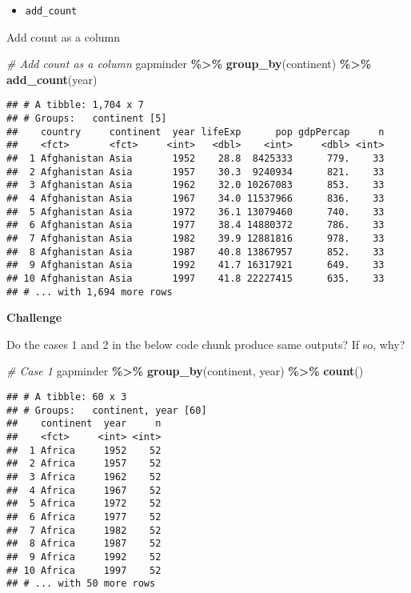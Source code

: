 \documentclass[
]{book}
\newenvironment{Shaded}{\begin{snugshade}}{\end{snugshade}}
\newcommand{\CommentTok}[1]{\textcolor[rgb]{0.56,0.35,0.01}{\textit{#1}}}
\newcommand{\KeywordTok}[1]{\textcolor[rgb]{0.13,0.29,0.53}{\textbf{#1}}}
\newcommand{\NormalTok}[1]{#1}
\newcommand{\OperatorTok}[1]{\textcolor[rgb]{0.81,0.36,0.00}{\textbf{#1}}}
\newcommand{\StringTok}[1]{\textcolor[rgb]{0.31,0.60,0.02}{#1}}
\providecommand{\tightlist}{%
  \setlength{\itemsep}{0pt}\setlength{\parskip}{0pt}}
\begin{document}
\begin{itemize}
\tightlist
\item
  \texttt{add\_count}
\end{itemize}

Add count as a column

\begin{Shaded}
\begin{Highlighting}[]
\CommentTok{\# Add count as a column}
\NormalTok{gapminder }\OperatorTok{\%\textgreater{}\%}
\StringTok{  }\KeywordTok{group\_by}\NormalTok{(continent) }\OperatorTok{\%\textgreater{}\%}
\StringTok{  }\KeywordTok{add\_count}\NormalTok{(year)}
\end{Highlighting}
\end{Shaded}

\begin{verbatim}
## # A tibble: 1,704 x 7
## # Groups:   continent [5]
##    country     continent  year lifeExp      pop gdpPercap     n
##    <fct>       <fct>     <int>   <dbl>    <int>     <dbl> <int>
##  1 Afghanistan Asia       1952    28.8  8425333      779.    33
##  2 Afghanistan Asia       1957    30.3  9240934      821.    33
##  3 Afghanistan Asia       1962    32.0 10267083      853.    33
##  4 Afghanistan Asia       1967    34.0 11537966      836.    33
##  5 Afghanistan Asia       1972    36.1 13079460      740.    33
##  6 Afghanistan Asia       1977    38.4 14880372      786.    33
##  7 Afghanistan Asia       1982    39.9 12881816      978.    33
##  8 Afghanistan Asia       1987    40.8 13867957      852.    33
##  9 Afghanistan Asia       1992    41.7 16317921      649.    33
## 10 Afghanistan Asia       1997    41.8 22227415      635.    33
## # ... with 1,694 more rows
\end{verbatim}

\textbf{Challenge}

Do the cases 1 and 2 in the below code chunk produce same outputs? If so, why?

\begin{Shaded}
\begin{Highlighting}[]
\CommentTok{\# Case 1}
\NormalTok{gapminder }\OperatorTok{\%\textgreater{}\%}
\StringTok{  }\KeywordTok{group\_by}\NormalTok{(continent, year) }\OperatorTok{\%\textgreater{}\%}
\StringTok{  }\KeywordTok{count}\NormalTok{()}
\end{Highlighting}
\end{Shaded}

\begin{verbatim}
## # A tibble: 60 x 3
## # Groups:   continent, year [60]
##    continent  year     n
##    <fct>     <int> <int>
##  1 Africa     1952    52
##  2 Africa     1957    52
##  3 Africa     1962    52
##  4 Africa     1967    52
##  5 Africa     1972    52
##  6 Africa     1977    52
##  7 Africa     1982    52
##  8 Africa     1987    52
##  9 Africa     1992    52
## 10 Africa     1997    52
## # ... with 50 more rows
\end{verbatim}
\end{document}
